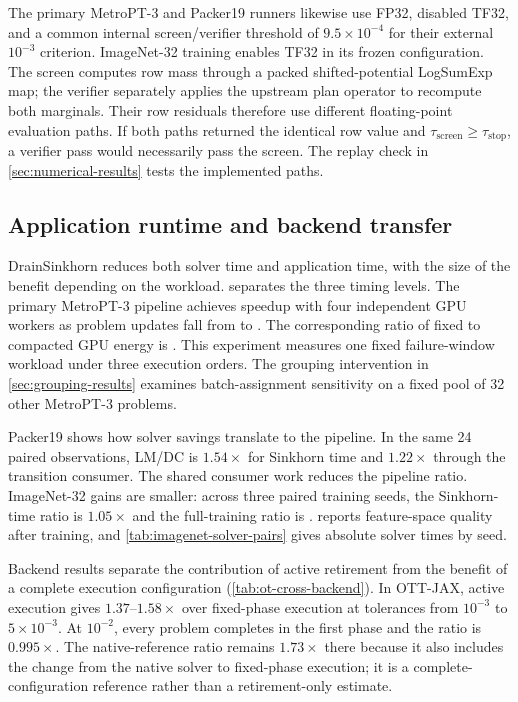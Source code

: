 The primary MetroPT-3 and Packer19 runners likewise use FP32, disabled TF32, and a common internal screen/verifier threshold of $9.5\times10^{-4}$ for their external $10^{-3}$ criterion. ImageNet-32 training enables TF32 in its frozen configuration. The screen computes row mass through a packed shifted-potential LogSumExp map; the verifier separately applies the upstream plan operator to recompute both marginals. Their row residuals therefore use different floating-point evaluation paths. If both paths returned the identical row value and $\tau_{\mathrm{screen}}\geq\tau_{\mathrm{stop}}$, a verifier pass would necessarily pass the screen. The replay check in \cref{sec:numerical-results} tests the implemented paths.

\subsection{Application runtime and backend transfer}
\label{sec:application-results}

DrainSinkhorn reduces both solver time and application time, with the size of the benefit depending on the workload.  separates the three timing levels. The primary MetroPT-3 pipeline achieves \CMetroCorrectedEndpointSpeedup{} speedup with four independent GPU workers as problem updates fall from \CMetroSlotsStatic{} to \CMetroSlotsActive{}. The corresponding ratio of fixed to compacted GPU energy is \CMetroCorrectedEnergyFactor{}. This experiment measures one fixed failure-window workload under three execution orders. The grouping intervention in \cref{sec:grouping-results} examines batch-assignment sensitivity on a fixed pool of 32 other MetroPT-3 problems.



Packer19 shows how solver savings translate to the pipeline. In the same 24 paired observations, LM/DC is $1.54\times$ for Sinkhorn time and $1.22\times$ through the transition consumer. The shared consumer work reduces the pipeline ratio. ImageNet-32 gains are smaller: across three paired training seeds, the Sinkhorn-time ratio is $1.05\times$ and the full-training ratio is \CFeatureTrainingActiveOverStatic{}.  reports feature-space quality after training, and \cref{tab:imagenet-solver-pairs} gives absolute solver times by seed.




Backend results separate the contribution of active retirement from the benefit of a complete execution configuration (\cref{tab:ot-cross-backend}). In OTT-JAX, active execution gives $1.37$--$1.58\times$ over fixed-phase execution at tolerances from $10^{-3}$ to $5\times10^{-3}$. At $10^{-2}$, every problem completes in the first phase and the ratio is $0.995\times$. The native-reference ratio remains $1.73\times$ there because it also includes the change from the native solver to fixed-phase execution; it is a complete-configuration reference rather than a retirement-only estimate.

